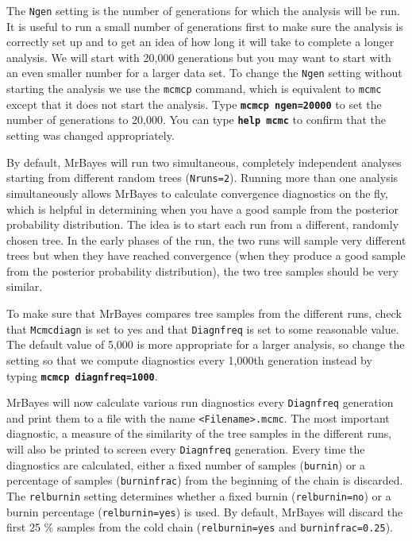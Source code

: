 \documentclass[12pt]{book}
\newcommand{\ttt}[1]{\texttt{#1}}
\newcommand{\tb}[1]{\ttt{\textbf{#1}}}
\begin{document}
The \ttt{Ngen} setting is the number of generations for which the analysis will be run. It is
useful to run a small number of generations first to make sure the analysis is correctly set up and
to get an idea of how long it will take to complete a longer analysis. We will start with 20,000
generations but you may want to start with an even smaller number for a larger data set. To change
the \ttt{Ngen} setting without starting the analysis we use the \ttt{mcmcp} command, which is
equivalent to \ttt{mcmc} except that it does not start the analysis. Type \tb{mcmcp ngen=20000} to
set the number of generations to 20,000. You can type \tb{help mcmc} to confirm that the setting
was changed appropriately.

By default, MrBayes will run two simultaneous, completely independent analyses starting from
different random trees (\ttt{Nruns=2}). Running more than one analysis simultaneously allows
MrBayes to calculate convergence diagnostics on the fly, which is helpful in determining when you
have a good sample from the posterior probability distribution. The idea is to start each run from
a different, randomly chosen tree. In the early phases of the run, the two runs will sample very
different trees but when they have reached convergence (when they produce a good sample from the
posterior probability distribution), the two tree samples should be very similar.

To make sure that MrBayes compares tree samples from the different runs, check that \ttt{Mcmcdiagn}
is set to yes and that \ttt{Diagnfreq} is set to some reasonable value. The default value of 5,000
is more appropriate for a larger analysis, so change the setting so that we compute diagnostics
every 1,000th generation instead by typing \tb{mcmcp diagnfreq=1000}.

MrBayes will now calculate various run diagnostics every \ttt{Diagnfreq} generation and print them
to a file with the name \ttt{<Filename>.mcmc}. The most important diagnostic, a measure of the
similarity of the tree samples in the different runs, will also be printed to screen every
\ttt{Diagnfreq} generation. Every time the diagnostics are calculated, either a fixed number of
samples (\ttt{burnin}) or a percentage of samples (\ttt{burninfrac}) from the beginning of the
chain is discarded. The \ttt{relburnin} setting determines whether a fixed burnin
(\ttt{relburnin=no}) or a burnin percentage (\ttt{relburnin=yes}) is used. By default, MrBayes will
discard the first 25 \% samples from the cold chain (\ttt{relburnin=yes} and
\ttt{burninfrac=0.25}).
\end{document}
